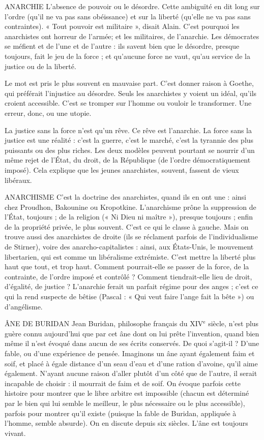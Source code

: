 ANARCHIE L'absence de pouvoir ou le désordre. Cette ambiguïté en dit
long sur l’ordre (qu’il ne va pas sans obéissance) et sur la liberté
(qu’elle ne va pas sans contraintes). « Tout pouvoir est militaire », disait Alain.
C’est pourquoi les anarchistes ont horreur de l’armée; et les militaires, de
l'anarchie. Les démocrates se méfient et de l’une et de l’autre : ils savent bien
que le désordre, presque toujours, fait le jeu de la force ; et qu'aucune force ne
vaut, qu’au service de la justice ou de la liberté.

Le mot est pris le plus souvent en mauvaise part. C’est donner raison à
Goethe, qui préférait l'injustice au désordre. Seuls les anarchistes y voient un
idéal, qu’ils croient accessible. C’est se tromper sur l’homme ou vouloir le
transformer. Une erreur, donc, ou une utopie.

La justice sans la force n’est qu’un rêve. Ce rêve est l’anarchie. La force sans
la justice est une réalité : c’est la guerre, c’est le marché, c’est la tyrannie des
plus puissants ou des plus riches. Les deux modèles peuvent pourtant se nourrir
d’un même rejet de l’État, du droit, de la République (de l’ordre démocratiquement
imposé). Cela explique que les jeunes anarchistes, souvent, fassent de
vieux libéraux.

ANARCHISME C'est la doctrine des anarchistes, quand ils en ont une : ainsi
chez Proudhon, Bakounine ou Kropotkine. L’anarchisme
prône la suppression de l’État, toujours ; de la religion (« Ni Dieu ni maître »),
presque toujours ; enfin de la propriété privée, le plus souvent. C’est ce qui le
classe à gauche. Mais on trouve aussi des anarchistes de droite (ils se réclament
parfois de l’individualisme de Stirner), voire des anarcho-capitalistes : ainsi, aux
États-Unis, le mouvement libertarien, qui est comme un libéralisme extrémiste.
C’est mettre la liberté plus haut que tout, et trop haut. Comment pourrait-elle
se passer de la force, de la contrainte, de l’ordre imposé et contrôlé ? Comment
tiendrait-elle lieu de droit, d'égalité, de justice ? L’anarchie ferait un parfait
régime pour des anges ; c’est ce qui la rend suspecte de bêtise (Pascal : « Qui
veut faire l’ange fait la bête ») ou d’angélisme.

ÂNE DE BURIDAN Jean Buridan, philosophe français du {\footnotesize XIV$^\text{e}$} siècle, n’est
plus guère connu aujourd’hui que par cet âne dont on
lui prête l'invention, quand bien même il n’est évoqué dans aucun de ses écrits
conservés. De quoi s’agit-il ? D’une fable, ou d’une expérience de pensée. Imaginons
un âne ayant également faim et soif, et placé à égale distance d’un seau
d’eau et d’une ration d’avoine, qu’il aime également. N'ayant aucune raison
d’aller plutôt d’un côté que de l’autre, il serait incapable de choisir : il mourrait
de faim et de soif. On évoque parfois cette histoire pour montrer que le libre
arbitre est impossible (chacun est déterminé par le bien qui lui semble le
meilleur, le plus nécessaire ou le plus accessible), parfois pour montrer qu'il
existe (puisque la fable de Buridan, appliquée à l’homme, semble absurde). On
en discute depuis six siècles. L’âne est toujours vivant.

